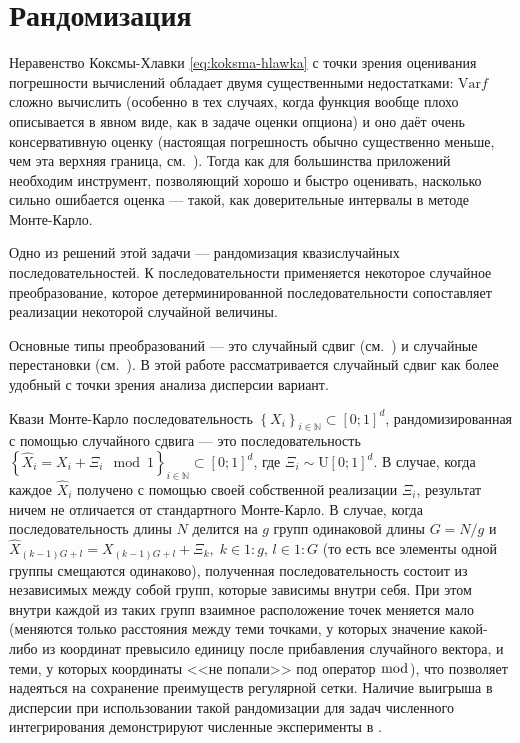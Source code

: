 \section{Рандомизация} %
\label{sec:qmc:randomization}

Неравенство Коксмы-Хлавки \eqref{eq:koksma-hlawka} с точки зрения оценивания погрешности вычислений обладает двумя существенными недостатками: $\mathrm{Var}f$ сложно вычислить (особенно в тех случаях, когда функция вообще плохо описывается в явном виде, как в задаче оценки опциона) и оно даёт очень консервативную оценку (настоящая погрешность обычно существенно меньше, чем эта верхняя граница, см.~\cite[стр.\,22]{Maize1994}). Тогда как для большинства приложений необходим инструмент, позволяющий хорошо и быстро оценивать, насколько сильно ошибается оценка --- такой, как доверительные интервалы в методе Монте-Карло.

Одно из решений этой задачи --- рандомизация квазислучайных последовательностей. К последовательности применяется некоторое случайное преобразование, которое детерминированной последовательности сопоставляет реализации некоторой случайной величины.

Основные типы преобразований --- это случайный сдвиг (см.~\cite{Tuffin2004}) и случайные перестановки (см.~\cite{Owen1995}). В этой работе рассматривается случайный сдвиг как более удобный с точки зрения анализа дисперсии вариант.

Квази Монте-Карло последовательность $\left\{ X_i\right\}_{i \in \mathbb N} \subset \left[0;1\right]^d$, рандомизированная с помощью случайного сдвига --- это последовательность $\left\{ \hat X_i = X_i + \Xi_i \mod 1\right\}_{i \in \mathbb N} \subset \left[0;1\right]^d$, где $\Xi_i \sim \mathrm U\left[0;1\right]^d$. В случае, когда каждое $\hat X_i$ получено с помощью своей собственной реализации $\Xi_i$, результат ничем не отличается от стандартного Монте-Карло. В случае, когда последовательность длины $N$ делится на $g$ групп одинаковой длины $G = N / g$ и $\hat X_{\left(k - 1\right)G + l} = X_{\left(k - 1\right)G + l} + \Xi_k, \;k \in 1\mathbin{:}g,\,l \in 1\mathbin{:}G$ (то есть все элементы одной группы смещаются одинаково), полученная последовательность состоит из независимых между собой групп, которые зависимы внутри себя. При этом внутри каждой из таких групп взаимное расположение точек меняется мало (меняются только расстояния между теми точками, у которых значение какой-либо из координат превысило единицу после прибавления случайного вектора, и теми, у которых координаты <<не попали>> под оператор $\bmod$), что позволяет надеяться на сохранение преимуществ регулярной сетки. Наличие выигрыша в дисперсии при использовании такой рандомизации для задач численного интегрирования демонстрируют численные эксперименты в \cite{Tuffin2004}.


